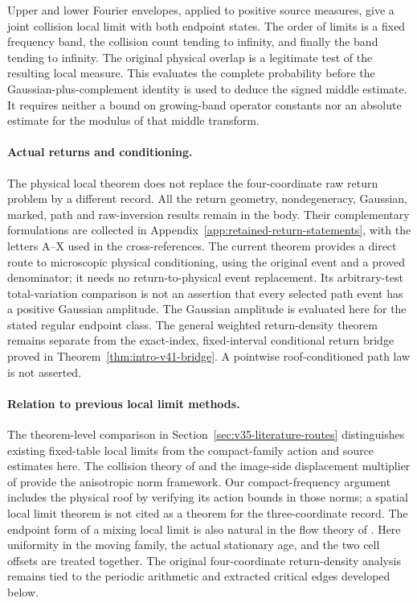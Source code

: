 \documentclass[11pt,reqno]{amsart}
\numberwithin{equation}{section}
\theoremstyle{definition}\newtheorem{definition}[theorem]{Definition}
\theoremstyle{remark}\newtheorem{remark}[theorem]{Remark}
\begin{document}
Upper and lower Fourier envelopes, applied to positive source measures,
give a joint collision local limit with both endpoint states. The order of limits is a fixed
frequency band, the collision count tending to infinity, and finally
the band tending to infinity. The original physical overlap is a
legitimate test of the resulting local measure. This evaluates the
complete probability before the Gaussian-plus-complement identity is
used to deduce the signed middle estimate. It requires neither a bound
on growing-band operator constants nor an absolute estimate for the
modulus of that middle transform.

\paragraph{Actual returns and conditioning.}
The physical local theorem does not replace the four-coordinate raw
return problem by a different record. All the return geometry,
nondegeneracy, Gaussian, marked, path and raw-inversion results remain
in the body. Their complementary formulations are collected in
Appendix~\ref{app:retained-return-statements}, with the letters A--X
used in the cross-references. The current theorem provides a direct
route to microscopic physical conditioning, using the original event
and a proved denominator; it needs no return-to-physical event
replacement. Its arbitrary-test total-variation comparison is not an
assertion that every selected path event has a positive Gaussian
amplitude. The Gaussian amplitude is evaluated here for the stated
regular endpoint class. The general weighted return-density theorem
remains separate from the exact-index, fixed-interval conditional
return bridge proved in Theorem~\ref{thm:intro-v41-bridge}. A pointwise
roof-conditioned path law is not asserted.

\paragraph{Relation to previous local limit methods.}
The theorem-level comparison in Section~\ref{sec:v35-literature-routes} distinguishes existing fixed-table local limits from the compact-family action and source estimates here. The collision theory of \cite{DZ11,DZ} and the image-side displacement
multiplier of \cite{DPZ} provide the anisotropic norm framework.
Our compact-frequency argument includes the physical roof by verifying
its action bounds in those norms; a spatial local limit theorem is not
cited as a theorem for the three-coordinate record. The endpoint form
of a mixing local limit is also natural in the flow theory of
\cite{DN}. Here uniformity in the moving family, the actual stationary
age, and the two cell offsets are treated together. The original
four-coordinate return-density analysis remains tied to the periodic
arithmetic and extracted critical edges developed below.
\end{document}

